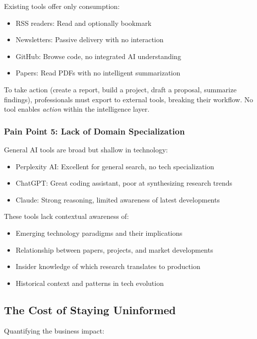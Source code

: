 \documentclass{report}
\begin{document}
Existing tools offer only consumption:
\begin{itemize}
    \item RSS readers: Read and optionally bookmark
    \item Newsletters: Passive delivery with no interaction
    \item GitHub: Browse code, no integrated AI understanding
    \item Papers: Read PDFs with no intelligent summarization
\end{itemize}

To take action (create a report, build a project, draft a proposal, summarize findings), professionals must export to external tools, breaking their workflow. No tool enables \textit{action} within the intelligence layer.

\subsubsection{Pain Point 5: Lack of Domain Specialization}

General AI tools are broad but shallow in technology:
\begin{itemize}
    \item Perplexity AI: Excellent for general search, no tech specialization
    \item ChatGPT: Great coding assistant, poor at synthesizing research trends
    \item Claude: Strong reasoning, limited awareness of latest developments
\end{itemize}

These tools lack contextual awareness of:
\begin{itemize}
    \item Emerging technology paradigms and their implications
    \item Relationship between papers, projects, and market developments
    \item Insider knowledge of which research translates to production
    \item Historical context and patterns in tech evolution
\end{itemize}

\subsection{The Cost of Staying Uninformed}

Quantifying the business impact:
\end{document}
